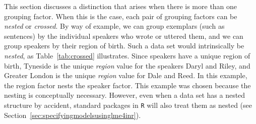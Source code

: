 \documentclass[a4paper,12pt]{article}
\begin{document}
This section discusses a distinction that arises when there is more than one grouping factor.
When this is the case, each pair of grouping factors can be \textit{nested} or \textit{crossed}.
By way of example, we can group exemplars (such as sentences) by the individual speakers who wrote or uttered them, and we can group speakers by their region of birth.
Such a data set would intrinsically be \textit{nested}, as Table~\ref{tab:crossed} illustrates.
Since speakers have a unique region of birth, Tyneside is the unique \textit{region} value for the speakers Daryl and Riley, and Greater London is the unique \textit{region} value for Dale and Reed.
In this example, the region factor nests the speaker factor.
This example was chosen because the nesting is conceptually necessary.
However, even when a data set has a nested structure by accident, standard packages in \texttt{R} will also treat them as nested
(see Section~\ref{sec:specifyingmodelsusinglme4inr}).
\end{document}
